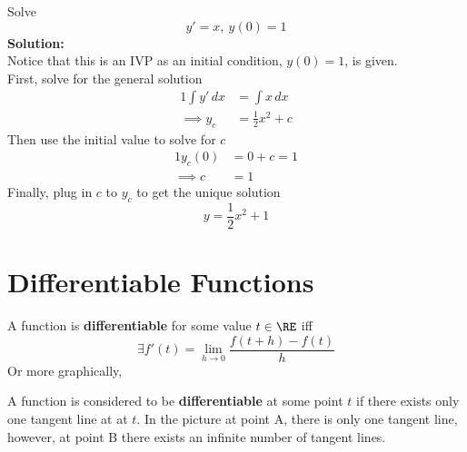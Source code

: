 \documentclass[diffeq.tex]{subfiles}
\begin{document}
    \begin{example}
        Solve
        \begin{equation}
            y' = x,\ y(0) = 1
        \end{equation}
        \textbf{Solution:}\\
        Notice that this is an IVP as an initial condition, $y(0) = 1$, is given.\\
        First, solve for the general solution
        \begin{alignat}{1}
            \int y'\,dx &= \int x\,dx\\
            \implies y_c &= \frac{1}{2}x^{2} + c
        \end{alignat}
        Then use the initial value to solve for $c$
        \begin{alignat}{1}
            y_c(0) &= 0 + c = 1\\
            \implies c &= 1
        \end{alignat}
        Finally, plug in $c$ to $y_{c}$ to get the unique solution
        \begin{equation}
            y = \frac{1}{2}x^{2} + 1
        \end{equation}
    \end{example}
    \np
    \section{Differentiable Functions}
    \begin{definition}[Differentiability]
        A function is \textbf{differentiable} for some value $t \in \RE$ iff
        \begin{equation}
            \exists f'(t) = \lim_{h\to0}\frac{f(t + h) - f(t)}{h}
        \end{equation}
        Or more graphically,
        \begin{center}
        \end{center}
        A function is considered to be \textbf{differentiable} at some point $t$ if there exists only one tangent line at at $t$. In the picture at point A, there is only one tangent line, however, at point B there exists an infinite number of tangent lines.
    \end{definition}
    \np
\end{document}
